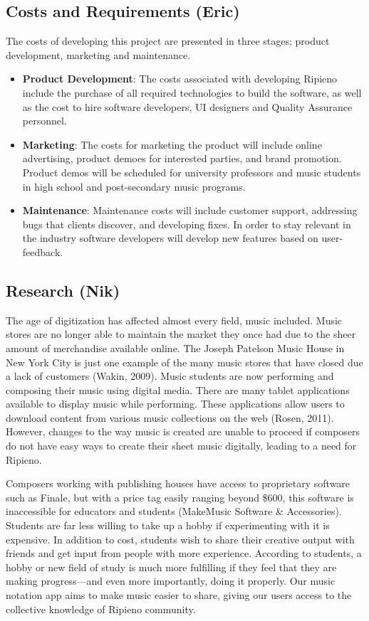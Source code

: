 \documentclass[12pt]{article}
\begin{document}
\subsection{Costs and Requirements (Eric)}
The costs of developing this project are presented in three stages; product development, marketing and maintenance.

\begin{itemize}
\item {\bf Product Development}: The costs associated with developing Ripieno include the purchase of all required technologies to build the software, as well as the cost to hire software developers, UI designers and Quality Assurance personnel.
\item {\bf Marketing}: The costs for marketing the product will include online advertising, product demoes for interested parties, and brand promotion. Product demos will be scheduled for university professors and music students in high school and post-secondary music programs.
\item {\bf Maintenance}: Maintenance costs will include customer support, addressing bugs that clients discover, and developing fixes. In order to stay relevant in the industry software developers will develop new features based on user-feedback.
\end{itemize}

\subsection{Research (Nik)}
The age of digitization has affected almost every field, music included. Music stores are no longer able to maintain the market they once had due to the sheer amount of merchandise available online. The Joseph Patelson Music House in New York City is just one example of the many music stores that have closed due a lack of customers (Wakin, 2009).  Music students are now performing and composing their music using digital media. There are many tablet applications available to display music while performing. These applications allow users to download content from various music collections on the web (Rosen, 2011). However, changes to the way music is created are unable to proceed if composers do not have easy ways to create their sheet music digitally, leading to a need for Ripieno.

Composers working with publishing houses have access to proprietary software such as Finale, but with a price tag easily ranging beyond \$600, this software is inaccessible for educators and students (MakeMusic Software \& Accessories). Students are far less willing to take up a hobby if experimenting with it is expensive. In addition to cost, students wish to share their creative output with friends and get input from people with more experience.  According to students, a hobby or new field of study is much more fulfilling if they feel that they are making progress---and even more importantly, doing it properly. Our music notation app aims to make music easier to share, giving our users access to the collective knowledge of Ripieno community.
\end{document}
